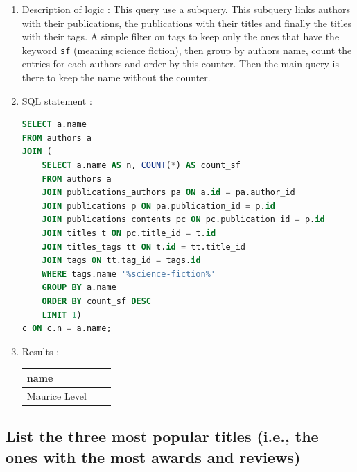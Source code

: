 \documentclass[doubleside, titlepage]{article}
\begin{document}
	\begin{enumerate}
	\item Description of logic : This query use a subquery. This subquery links authors with their publications, the publications with their titles and finally the titles with their tags. A simple filter on tags to keep only the ones that have the keyword \texttt{sf} (meaning science fiction), then group by authors name, count the entries for each authors and order by this counter. Then the main query is there to keep the name without the counter.
	\item SQL statement :
		\begin{lstlisting}[language=SQL,showspaces=false,basicstyle=\ttfamily,numberstyle=\tiny,commentstyle=\color{gray}]
SELECT a.name
FROM authors a
JOIN (
	SELECT a.name AS n, COUNT(*) AS count_sf
	FROM authors a
	JOIN publications_authors pa ON a.id = pa.author_id
	JOIN publications p ON pa.publication_id = p.id
	JOIN publications_contents pc ON pc.publication_id = p.id
	JOIN titles t ON pc.title_id = t.id
	JOIN titles_tags tt ON t.id = tt.title_id
	JOIN tags ON tt.tag_id = tags.id
	WHERE tags.name '%science-fiction%'
	GROUP BY a.name
	ORDER BY count_sf DESC
	LIMIT 1)
c ON c.n = a.name;
		\end{lstlisting}

	\item Results :\\

	\begin{tabular}{|l|c|r|}
	  \hline
		name\\
	  \hline
		Maurice Level\\
	  \hline
	\end{tabular}
\end{enumerate}

\subsection{List the three most popular titles (i.e., the ones with the most awards and reviews)}
\end{document}
